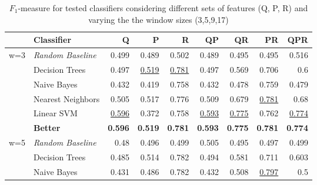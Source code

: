 \documentclass[runningheads]{llncs}
\begin{document}
\begin{table*}[t]
	\centering
	\caption{$F_1$-measure for tested classifiers considering different sets of features (Q, P, R) and varying the the window sizes (3,5,9,17)}
	\label{tab:classifier}
	\begin{tabular}{l@{\hskip 0.1in}l@{\hskip 0.1in}r@{\hskip 0.1in}r@{\hskip 0.1in}r@{\hskip 0.1in}r@{\hskip 0.1in}r@{\hskip 0.1in}r@{\hskip 0.1in}r}    \toprule		  
		& \textbf{Classifier}        & \textsc{Q}         & \textsc{P}         & \textsc{R}         & \textsc{QP}        & \textsc{QR}        & \textsc{PR}        & \textsc{QPR}       \\    \midrule
	w=3 	& \textit{Random Baseline} & 0.499          & 0.489          & 0.502          & 0.489          & 0.495          & 0.495          & 0.516          \\
		& Decision Trees           & 0.497          & \underline{0.519}    & \underline{0.781}    & 0.497          & 0.569          & 0.706          & 0.6            \\
		& Naive Bayes              & 0.432          & 0.419          & 0.758          & 0.432          & 0.478          & 0.759          & 0.479          \\
		& Nearest Neighbors        & 0.505          & 0.517          & 0.776          & 0.509          & 0.679          & \underline{0.781}    & 0.68           \\
		& Linear SVM               & \underline{0.596}    & 0.372          & 0.758          & \underline{0.593}    & \underline{0.775}    & 0.762          & \underline{0.774}    \\    \midrule
		& \textbf{Better}          & \textbf{0.596} & \textbf{0.519} & \textbf{0.781} & \textbf{0.593} & \textbf{0.775} & \textbf{0.781} & \textbf{0.774} \\    \bottomrule
	w=5	& \textit{Random Baseline} & 0.48           & 0.496          & 0.499          & 0.505          & 0.495          & 0.497          & 0.499          \\
		& Decision Trees           & 0.485          & 0.514          & 0.782          & 0.494          & 0.581          & 0.711          & 0.603          \\
		& Naive Bayes              & 0.431          & 0.486          & 0.782          & 0.432          & 0.508          & \underline{0.797}    & 0.5            \\

\end{tabular}
\end{table*}
\end{document}
